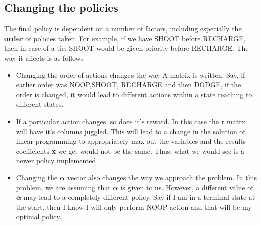 \documentclass[11pt]{article}
\begin{document}
		\subsection{Changing the policies}
		The final policy is dependent on a number of factors, including especially the \textbf{order} of policies taken.
		For example, if we have SHOOT before RECHARGE, then in case of a tie, SHOOT would be given priority before RECHARGE.
		The way it affects is as follows - 
		\begin{itemize}
			\item Changing the order of actions changes the way A matrix is written. Say, if earlier order was NOOP,SHOOT, RECHARGE and then DODGE, if the order 
			is changed, it would lead to different actions within a state reaching to different states. 
			\item If a particular action changes, so does it's reward. In this case the \textbf{r} matrx will have it's columns juggled. This will lead to a change 
			in the solution of linear programming to appropriately max out the variables and the results coefficients \textbf{x} we get would not be the same.
			Thus, what we would see is a newer policy implemented.
			\item Changing the $\boldsymbol{\alpha}$ vector also changes the way we approach the problem. In this problem, we are assuming that $\boldsymbol{\alpha}$ is given to us.
			However, a different value of $\boldsymbol{\alpha}$ may lead to a completely different policy. Say if I am in a terminal state at the start, then I know I will only perform
			NOOP action and that will be my optimal policy. 
		\end{itemize}
\end{document}
